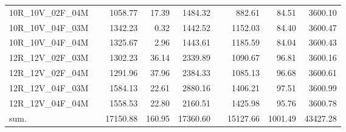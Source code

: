 \begin{tabular}{llrrrlrrr}
10R\_10V\_02F\_04M & \hspace{0.1cm} & 1058.77 & 17.39 & 1484.32 & \hspace{0.2cm} & 882.61 & 84.51 & 3600.10\\
10R\_10V\_04F\_03M & \hspace{0.1cm} & 1342.23 & 0.32 & 1442.52 & \hspace{0.2cm} & 1152.03 & 84.40 & 3600.47\\
10R\_10V\_04F\_04M & \hspace{0.1cm} & 1325.67 & 2.96 & 1443.61 & \hspace{0.2cm} & 1185.59 & 84.04 & 3600.43\\
\addlinespace
12R\_12V\_02F\_03M & \hspace{0.1cm} & 1302.23 & 36.14 & 2339.89 & \hspace{0.2cm} & 1090.67 & 96.81 & 3600.16\\
12R\_12V\_02F\_04M & \hspace{0.1cm} & 1291.96 & 37.96 & 2384.33 & \hspace{0.2cm} & 1085.13 & 96.68 & 3600.61\\
12R\_12V\_04F\_03M & \hspace{0.1cm} & 1584.13 & 22.61 & 2880.16 & \hspace{0.2cm} & 1406.21 & 97.51 & 3600.99\\
12R\_12V\_04F\_04M & \hspace{0.1cm} & 1558.53 & 22.80 & 2160.51 & \hspace{0.2cm} & 1425.98 & 95.76 & 3600.78\\
\addlinespace
sum. & \hspace{0.1cm} & 17150.88 & 160.95 & 17360.60 & \hspace{0.2cm} & 15127.66 & 1001.49 & 43427.28\\
\bottomrule
\end{tabular}
